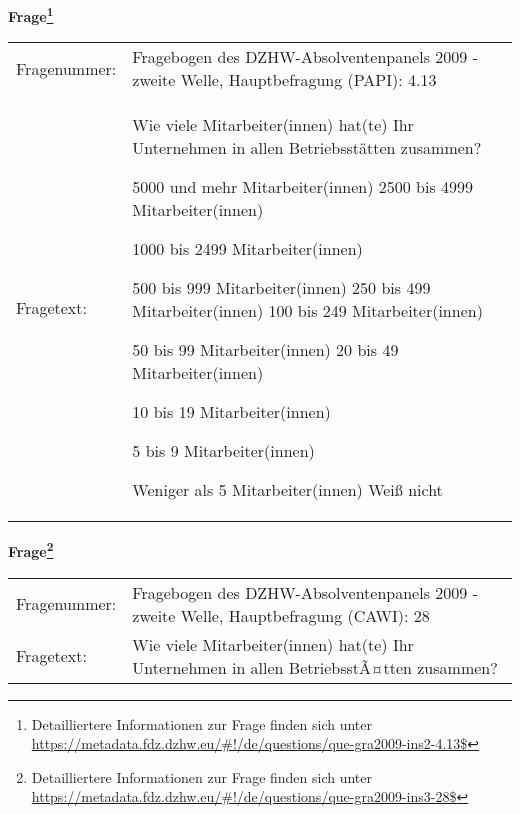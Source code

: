 				\vspace*{0.5cm}
                \noindent\textbf{Frage\footnote{Detailliertere Informationen zur Frage finden sich unter
		              \url{https://metadata.fdz.dzhw.eu/\#!/de/questions/que-gra2009-ins2-4.13$}}}\\
				\begin{tabularx}{\hsize}{@{}lX}
					Fragenummer: &
					  Fragebogen des DZHW-Absolventenpanels 2009 - zweite Welle, Hauptbefragung (PAPI):
					  4.13
 \\
					Fragetext: & Wie viele Mitarbeiter(innen) hat(te) Ihr Unternehmen in allen Betriebsstätten zusammen?\par  5000 und mehr Mitarbeiter(innen) 2500 bis 4999 Mitarbeiter(innen)\par  1000 bis 2499 Mitarbeiter(innen)\par  500 bis 999 Mitarbeiter(innen) 250 bis 499 Mitarbeiter(innen) 100 bis 249 Mitarbeiter(innen)\par  50 bis 99 Mitarbeiter(innen) 20 bis 49 Mitarbeiter(innen)\par  10 bis 19 Mitarbeiter(innen)\par  5 bis 9 Mitarbeiter(innen)\par  Weniger als 5 Mitarbeiter(innen) Weiß nicht \\
				\end{tabularx}
				\vspace*{0.5cm}
                \noindent\textbf{Frage\footnote{Detailliertere Informationen zur Frage finden sich unter
		              \url{https://metadata.fdz.dzhw.eu/\#!/de/questions/que-gra2009-ins3-28$}}}\\
				\begin{tabularx}{\hsize}{@{}lX}
					Fragenummer: &
					  Fragebogen des DZHW-Absolventenpanels 2009 - zweite Welle, Hauptbefragung (CAWI):
					  28
 \\
					Fragetext: & Wie viele Mitarbeiter(innen) hat(te) Ihr Unternehmen in allen BetriebsstÃ¤tten zusammen? \\
				\end{tabularx}





